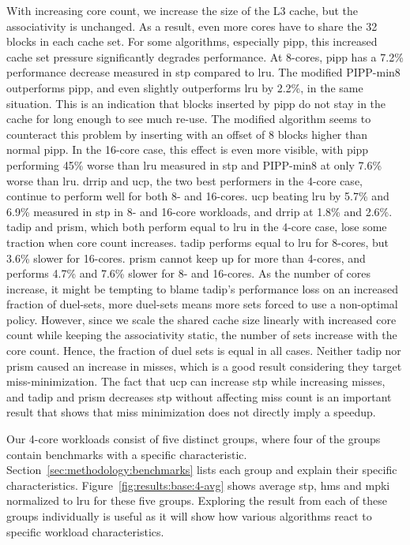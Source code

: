 With increasing core count, we increase the size of the L3 cache, but the associativity is unchanged.
As a result, even more cores have to share the 32 blocks in each cache set.
For some algorithms, especially \gls{pipp}, this increased cache set pressure significantly degrades performance.
At 8-cores, \gls{pipp} has a 7.2\% performance decrease measured in \gls{stp} compared to \gls{lru}.
The modified PIPP-min8 outperforms \gls{pipp}, and even slightly outperforms \gls{lru} by 2.2\%, in the same situation.
This is an indication that blocks inserted by \gls{pipp} do not stay in the cache for long enough to see much re-use.
The modified algorithm seems to counteract this problem by inserting with an offset of 8 blocks higher than normal \gls{pipp}.
In the 16-core case, this effect is even more visible, with \gls{pipp} performing 45\% worse than \gls{lru} measured in \gls{stp} and PIPP-min8 at only 7.6\% worse than \gls{lru}.
\gls{drrip} and \gls{ucp}, the two best performers in the 4-core case, continue to perform well for both 8- and 16-cores.
\gls{ucp} beating \gls{lru} by 5.7\% and 6.9\% measured in \gls{stp} in 8- and 16-core workloads, and \gls{drrip} at 1.8\% and 2.6\%.
\gls{tadip} and \gls{prism}, which both perform equal to \gls{lru} in the 4-core case, lose some traction when core count increases.
\gls{tadip} performs equal to \gls{lru} for 8-cores, but 3.6\% slower for 16-cores.
\gls{prism} cannot keep up for more than 4-cores, and performs 4.7\% and 7.6\% slower for 8- and 16-cores.
As the number of cores increase, it might be tempting to blame \gls{tadip}'s performance loss on an increased fraction of duel-sets, more duel-sets means more sets forced to use a non-optimal policy.
However, since we scale the shared cache size linearly with increased core count while keeping the associativity static, the number of sets increase with the core count.
Hence, the fraction of duel sets is equal in all cases.
Neither \gls{tadip} nor \gls{prism} caused an increase in misses, which is a good result considering they target miss-minimization.
The fact that \gls{ucp} can increase \gls{stp} while increasing misses, and \gls{tadip} and \gls{prism} decreases \gls{stp} without affecting miss count is an important result that shows that miss minimization does not directly imply a speedup.

Our 4-core workloads consist of five distinct groups, where four of the groups contain benchmarks with a specific characteristic.
Section~\ref{sec:methodology:benchmarks} lists each group and explain their specific characteristics.
Figure~\ref{fig:results:base:4-avg} shows average \gls{stp}, \gls{hms} and \gls{mpki} normalized to \gls{lru} for these five groups.
Exploring the result from each of these groups individually is useful as it will show how various algorithms react to specific workload characteristics.

